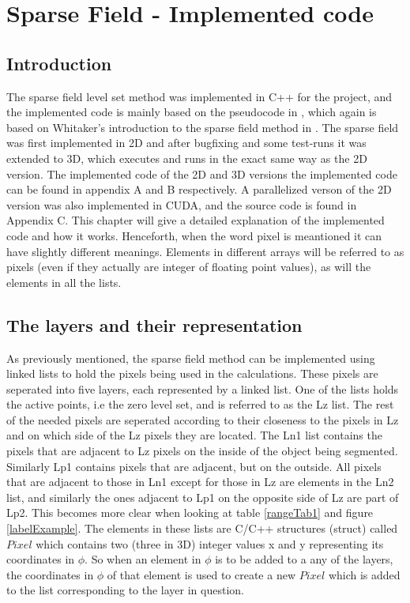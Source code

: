 \chapter{Sparse Field - Implemented code}
\label{implementedChap}
\section{Introduction}
The sparse field level set method was implemented in C++ for the project, and the implemented code is mainly based on the pseudocode in \cite{lankton09}, which again is based on Whitaker's introduction to the sparse field method in \cite{whitaker89}. 
The sparse field was first implemented in 2D and after bugfixing and some test-runs it was extended to 3D, which executes and runs in the exact same way as the 2D version. The implemented code of the 2D and 3D versions the implemented code can be found in appendix A and B respectively. A parallelized verson of the 2D version was also implemented in CUDA, and the source code is found in Appendix C. This chapter will give a detailed explanation of the implemented code and how it works. Henceforth, when the word pixel is meantioned it can have slightly different meanings. Elements in different arrays will be referred to as pixels (even if they actually are integer of floating point values), as will the elements in all the lists. 

\section{The layers and their representation}
As previously mentioned, the sparse field method can be implemented using linked lists to hold the pixels being used in the calculations. These pixels are seperated into five layers, each represented by a linked list. One of the lists holds the active points, i.e the zero level set, and is referred to as the Lz list. The rest of the needed pixels are seperated according to their closeness to the pixels in Lz and on which side of the Lz pixels they are located. The Ln1 list contains the pixels that are adjacent to Lz pixels on the inside of the object being segmented. Similarly Lp1 contains pixels that are adjacent, but on the outside. All pixels that are adjacent to those in Ln1 except for those in Lz are elements in the Ln2 list, and similarly the ones adjacent to Lp1 on the opposite side of Lz are part of Lp2. This becomes more clear when looking at table \ref{rangeTab1} and figure \ref{labelExample}. The elements in these lists are C/C++ structures (struct) called $Pixel$ which contains two (three in 3D) integer values x and y representing its coordinates in $\phi$. So when an element in $\phi$ is to be added to a any of the layers, the coordinates in $\phi$ of that element is used to create a new $Pixel$ which is added to the list corresponding to the layer in question. 

